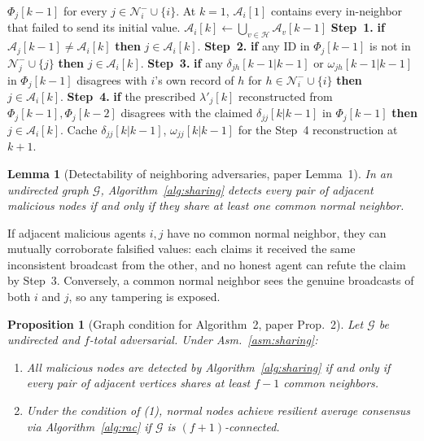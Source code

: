 \documentclass[journal]{IEEEtran}
\newtheorem{lemma}{Lemma}
\newtheorem{proposition}{Proposition}
\newcommand{\NN}{\mathcal{N}}
\newcommand{\HH}{\mathcal{H}}
\newcommand{\AA}{\mathcal{A}}
\newcommand{\MM}{\mathcal{M}}
\newcommand{\GG}{\mathcal{G}}
\begin{document}
\begin{algorithm}[t]
\caption{Sharing Detection (paper Algorithm~2)}
\label{alg:sharing}
\begin{algorithmic}[1]
\Require $\Phi_j[k\!-\!1]$ for every $j\in\NN_i^-\cup\{i\}$.
\State At $k=1$, $\AA_i[1]$ contains every in-neighbor that failed to send
       its initial value.
  \State $\AA_i[k] \leftarrow \bigcup_{v\in\HH} \AA_v[k\!-\!1]$
  \For{$j\in\MM_i^-[k]$}
    \State \textbf{Step~1.} \textbf{if} $\AA_j[k\!-\!1]\neq\AA_i[k]$
           \textbf{then} $j\in\AA_i[k]$.
    \State \textbf{Step~2.} \textbf{if} any ID in $\Phi_j[k\!-\!1]$
           is not in $\NN_j^-\cup\{j\}$ \textbf{then} $j\in\AA_i[k]$.
    \State \textbf{Step~3.} \textbf{if} any
           $\delta_{jh}[k\!-\!1|k\!-\!1]$ or
           $\omega_{jh}[k\!-\!1|k\!-\!1]$ in $\Phi_j[k\!-\!1]$ disagrees
           with $i$'s own record of $h$ for $h\in\NN_i^-\cup\{i\}$
           \textbf{then} $j\in\AA_i[k]$.
    \State \textbf{Step~4.} \textbf{if} the prescribed
           $\lambda'_j[k]$ reconstructed from
           $\Phi_j[k\!-\!1],\Phi_j[k\!-\!2]$ disagrees with the claimed
           $\delta_{jj}[k|k\!-\!1]$ in $\Phi_j[k\!-\!1]$
           \textbf{then} $j\in\AA_i[k]$.
  \EndFor
\EndFor
\State Cache $\delta_{jj}[k|k\!-\!1]$, $\omega_{jj}[k|k\!-\!1]$ for the
       Step~4 reconstruction at $k\!+\!1$.
\end{algorithmic}
\end{algorithm}

\begin{lemma}[Detectability of neighboring adversaries, paper Lemma~1]
\label{lem:adjpair}
In an undirected graph $\GG$, Algorithm~\ref{alg:sharing} detects every pair
of adjacent malicious nodes if and only if they share at least one common
\emph{normal} neighbor.
\end{lemma}

\begin{IEEEproof}[Sketch]
If adjacent malicious agents $i,j$ have no common normal neighbor, they can
mutually corroborate falsified values: each claims it received the same
inconsistent broadcast from the other, and no honest agent can refute the
claim by Step~3.  Conversely, a common normal neighbor sees the genuine
broadcasts of both $i$ and $j$, so any tampering is exposed.
\end{IEEEproof}

\begin{proposition}[Graph condition for Algorithm~2, paper Prop.~2]
Let $\GG$ be undirected and $f$-total adversarial.  Under
Asm.~\ref{asm:sharing}:
\begin{enumerate}
\item All malicious nodes are detected by Algorithm~\ref{alg:sharing} if and
only if every pair of adjacent vertices shares at least $f-1$ common
neighbors.
\item Under the condition of (1), normal nodes achieve resilient average
consensus via Algorithm~\ref{alg:rac} if $\GG$ is $(f+1)$-connected.
\end{enumerate}
\end{proposition}
\end{document}
